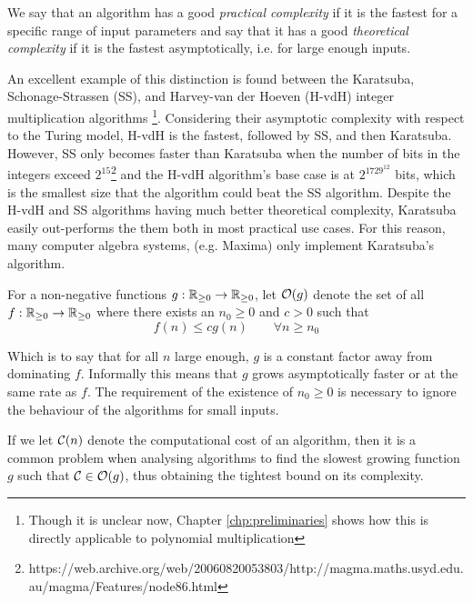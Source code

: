 We say that an algorithm has a good \textit{practical complexity} if it is the fastest for a specific range of input parameters and say that it has a good \textit{theoretical complexity} if it is the fastest asymptotically, i.e. for large enough inputs.

An excellent example of this distinction is found between the Karatsuba, Schonage-Strassen (SS), and Harvey-van der Hoeven (H-vdH) integer multiplication algorithms \footnote{Though it is unclear now, Chapter \ref{chp:preliminaries} shows how this is directly applicable to polynomial multiplication}. Considering their asymptotic complexity with respect to the Turing model, H-vdH is the fastest, followed by SS, and then Karatsuba. However, SS only becomes faster than Karatsuba when the number of bits in the integers exceed $2^{15}$\footnote{https://web.archive.org/web/20060820053803/http://magma.maths.usyd.edu.au/magma/Features/node86.html} and the H-vdH algorithm's base case is at $2^{1729^{12}}$ bits, which is the smallest size that the algorithm could beat the SS algorithm. Despite the H-vdH and SS algorithms having much better theoretical complexity, Karatsuba easily out-performs the them both in most practical use cases. For this reason, many computer algebra systems, (e.g. Maxima) only implement Karatsuba's algorithm.

\begin{definition}
    For a non-negative functions $g: {\mathbb R}_{\ge 0} \to {\mathbb R}_{\ge 0}$, let $\mathcal O(g)$ denote the set of all $f: {\mathbb R}_{\ge 0} \to {\mathbb R}_{\ge 0}$ where there exists an $n_0 \ge 0$ and $c > 0$ such that
    \begin{equation}\label{eq:big-o}
        f(n) \le cg(n) \qquad \forall n \ge n_0
    \end{equation}
\end{definition}
Which is to say that for all $n$ large enough, $g$ is a constant factor away from dominating $f$. Informally this means that $g$ grows asymptotically faster or at the same rate as $f$. The requirement of the existence of $n_0 \ge 0$ is necessary to ignore the behaviour of the algorithms for small inputs.

If we let $\mathcal C(n)$ denote the computational cost of an algorithm, then it is a common problem when analysing algorithms to find the slowest growing function $g$ such that $\mathcal C \in \mathcal O(g)$, thus obtaining the tightest bound on its complexity.

